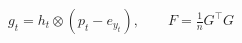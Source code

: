 \documentclass[border=3pt]{standalone}
\begin{document}
\color{ink}\fontsize{23}{28}\selectfont
$\displaystyle g_t=h_t\otimes(p_t-e_{y_t}),\qquad F=\frac1nG^\top G$
\end{document}
